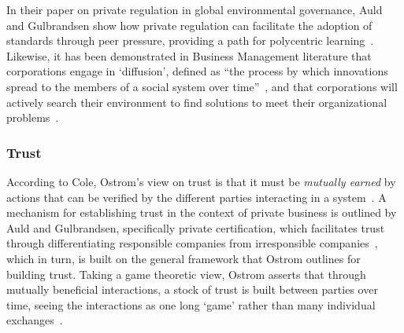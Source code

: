 



In their paper on private regulation in global environmental
governance, Auld and Gulbrandsen show how private regulation can
facilitate the adoption of standards through peer pressure, providing
a path for polycentric learning~\citep{auld2013private}. Likewise, it
has been demonstrated in Business Management literature that
corporations engage in `diffusion', defined as ``the process by which
innovations spread to the members of a social system over
time''~\citep{rogers1979diffusion}, and that corporations will
actively search their environment to find solutions to meet their
organizational problems~\citep[p.371]{rogers2010diffusion}.

\subsubsection{Trust}



According to Cole, Ostrom's view on trust is that it must be
\textit{mutually earned} by actions that can be verified by the
different parties interacting in a
system~\citep{cole2015advantages}. A mechanism for establishing trust
in the context of private business is outlined by Auld and
Gulbrandsen, specifically private certification, which facilitates
trust through differentiating responsible companies from irresponsible
companies~\citep[p.396]{auld2013private}, which in turn, is built on
the general framework that Ostrom outlines for building trust. Taking
a game theoretic view, Ostrom asserts that through mutually beneficial
interactions, a stock of trust is built between parties over time,
seeing the interactions as one long `game' rather than many individual
exchanges~\citep{bromley1992making}.


